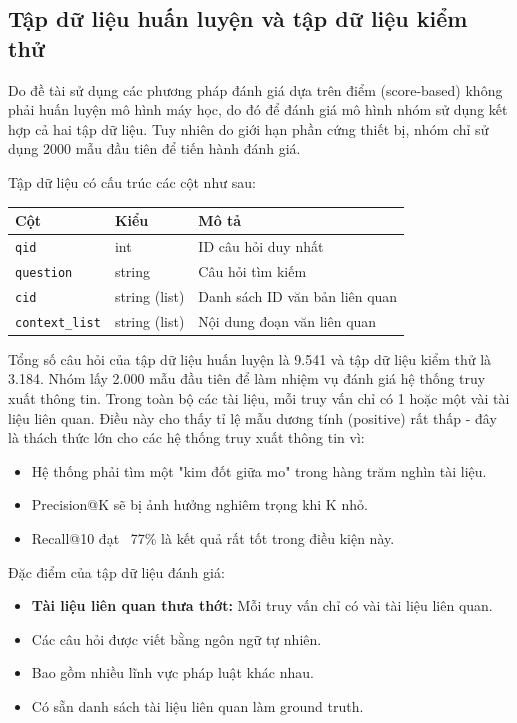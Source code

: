 \documentclass[../BTL.tex]{subfiles}
\begin{document}
\subsection{Tập dữ liệu huấn luyện và tập dữ liệu kiểm thử}
Do đề tài sử dụng các phương pháp đánh giá dựa trên điểm (score-based) không phải huấn luyện mô hình máy học, do đó để đánh giá mô hình nhóm sử dụng kết hợp cả hai tập dữ liệu. Tuy nhiên do giới hạn phần cứng thiết bị, nhóm chỉ sử dụng 2000 mẫu đầu tiên để tiến hành đánh giá.

Tập dữ liệu có cấu trúc các cột như sau:

\begin{table}[H]
\centering
\begin{tabular}{|l|l|l|}
\hline
Cột & Kiểu & Mô tả \\ \hline
\texttt{qid} & int & ID câu hỏi duy nhất \\ \hline
\texttt{question} & string & Câu hỏi tìm kiếm \\ \hline
\texttt{cid} & string (list) & Danh sách ID văn bản liên quan \\ \hline
\texttt{context\_list} & string (list) & Nội dung đoạn văn liên quan \\ \hline
\end{tabular}
\end{table}

Tổng số câu hỏi của tập dữ liệu huấn luyện là 9.541 và tập dữ liệu kiểm thử là 3.184. Nhóm lấy 2.000 mẫu đầu tiên để làm nhiệm vụ đánh giá hệ thống truy xuất thông tin. Trong toàn bộ các tài liệu, mỗi truy vấn chỉ có 1 hoặc một vài tài liệu liên quan. Điều này cho thấy tỉ lệ mẫu dương tính (positive) rất thấp - đây là thách thức lớn cho các hệ thống truy xuất thông tin vì:

\begin{itemize}
    \item Hệ thống phải tìm một "kim đốt giữa mo" trong hàng trăm nghìn tài liệu.
    \item Precision@K sẽ bị ảnh hưởng nghiêm trọng khi K nhỏ.
    \item Recall@10 đạt ~77\% là kết quả rất tốt trong điều kiện này.
\end{itemize}

Đặc điểm của tập dữ liệu đánh giá:
\begin{itemize}
    \item \textbf{Tài liệu liên quan thưa thớt:} Mỗi truy vấn chỉ có vài tài liệu liên quan.
    \item Các câu hỏi được viết bằng ngôn ngữ tự nhiên.
    \item Bao gồm nhiều lĩnh vực pháp luật khác nhau.
    \item Có sẵn danh sách tài liệu liên quan làm ground truth.
\end{itemize}
\end{document}
